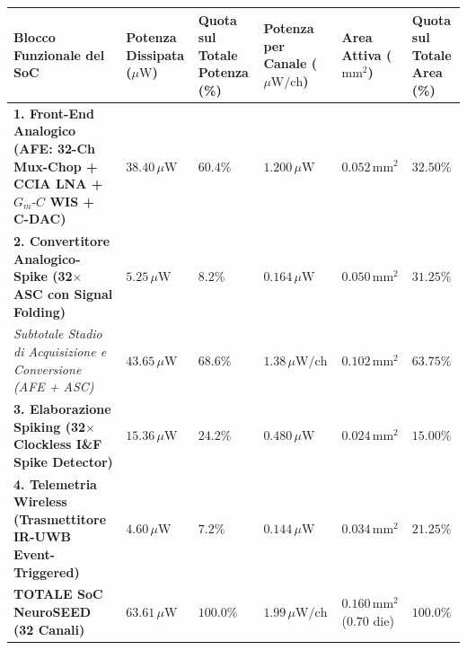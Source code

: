 \documentclass[11pt,a4paper]{article}
\begin{document}
\begin{center}
\scriptsize
\renewcommand{\arraystretch}{1.3}
\begin{tabularx}{\textwidth}{|>{\raggedright\arraybackslash}X|>{\raggedright\arraybackslash}X|>{\raggedright\arraybackslash}X|>{\raggedright\arraybackslash}X|>{\raggedright\arraybackslash}X|>{\raggedright\arraybackslash}X|}
\hline
\textbf{Blocco Funzionale del SoC} & \textbf{Potenza Dissipata ($\mu\text{W}$)} & \textbf{Quota sul Totale Potenza (\%)} & \textbf{Potenza per Canale ($\mu\text{W/ch}$)} & \textbf{Area Attiva ($\text{mm}^2$)} & \textbf{Quota sul Totale Area (\%)} \\ \hline \hline
\textbf{1. Front-End Analogico (AFE: 32-Ch Mux-Chop + CCIA LNA + $G_m\text{-}C$ WIS + C-DAC)} & \textbf{$38.40\,\mu\text{W}$} & \textbf{$60.4\%$} & $1.200\,\mu\text{W}$ & \textbf{$0.052\,\text{mm}^2$} & \textbf{$32.50\%$} \\ \hline
\textbf{2. Convertitore Analogico-Spike (32$\times$ ASC con Signal Folding)} & \textbf{$5.25\,\mu\text{W}$} & \textbf{$8.2\%$} & $0.164\,\mu\text{W}$ & \textbf{$0.050\,\text{mm}^2$} & \textbf{$31.25\%$} \\ \hline
\textit{Subtotale Stadio di Acquisizione e Conversione (AFE + ASC)} & \textbf{\textit{$43.65\,\mu\text{W}$}} & \textbf{\textit{$68.6\%$}} & \textbf{\textit{$1.38\,\mu\text{W/ch}$}} & \textbf{\textit{$0.102\,\text{mm}^2$}} & \textbf{\textit{$63.75\%$}} \\ \hline
\textbf{3. Elaborazione Spiking (32$\times$ Clockless I\&F Spike Detector)} & \textbf{$15.36\,\mu\text{W}$} & \textbf{$24.2\%$} & \textbf{$0.480\,\mu\text{W}$} & \textbf{$0.024\,\text{mm}^2$} & \textbf{$15.00\%$} \\ \hline
\textbf{4. Telemetria Wireless (Trasmettitore IR-UWB Event-Triggered)} & \textbf{$4.60\,\mu\text{W}$} & \textbf{$7.2\%$} & $0.144\,\mu\text{W}$ & \textbf{$0.034\,\text{mm}^2$} & \textbf{$21.25\%$} \\ \hline
\textbf{TOTALE SoC NeuroSEED (32 Canali)} & \textbf{$63.61\,\mu\text{W}$} & \textbf{$100.0\%$} & \textbf{$1.99\,\mu\text{W/ch}$} & \textbf{$0.160\,\text{mm}^2$} ($0.70$ die) & \textbf{$100.0\%$} \\ \hline
\end{tabularx}
\end{center}
\normalsize
\end{document}

